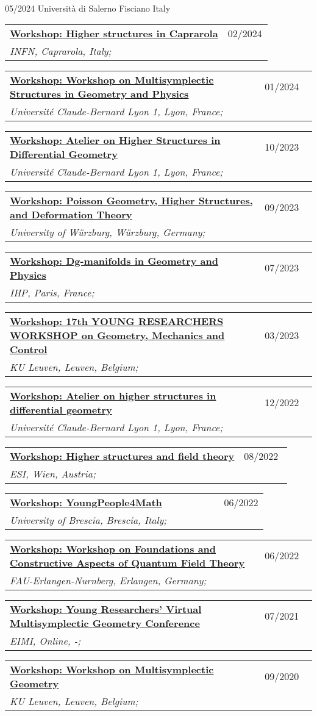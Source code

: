 \documentclass[a4paper]{article}
\newcommand{\longvoice}[8]{
	\begin{tabular}{p{0.83\linewidth} p{0.17\linewidth} }
		\textbf{\href{#3}{#2: #1}} & #4 
		\\ 
		\textit{#5, #6, #7;} & {\small\emph{#8}}
	\end{tabular}
	\vspace{.5em}
}
\begin{document}
		{05/2024}
		{Università di Salerno}
		{Fisciano}
		{Italy}
		{}
	\longvoice{Higher structures in Caprarola}
		{Workshop}
		{http://wpage.unina.it/francesco.dandrea/Caprarola2024/index.html}
		{02/2024}
		{INFN}
		{Caprarola}
		{Italy}
		{}
	\longvoice{Workshop on Multisymplectic Structures in Geometry and Physics}
		{Workshop}
		{https://math.gmu.edu/~cblacke/lyon.html}
		{01/2024}
		{Université Claude-Bernard Lyon 1}
		{Lyon}
		{France}
		{}
	\longvoice{Atelier on Higher Structures in Differential Geometry}
		{Workshop}
		{https://ryvkin.eu/hs2023/index.html}
		{10/2023}
		{Université Claude-Bernard Lyon 1}
		{Lyon}
		{France}
		{}
	\longvoice{Poisson Geometry, Higher Structures, and Deformation Theory}
		{Workshop}
		{https://www.mathematik.uni-wuerzburg.de/mathematicalphysics/forschung/veranstaltungen/workshops-und-konferenzen/single/news/poisson-geometry-higher-structures-and-deformation-theory/}
		{09/2023}
		{University of Würzburg}
		{Würzburg}
		{Germany}
		{}
	\longvoice{Dg-manifolds in Geometry and Physics}
		{Workshop}
		{https://indico.math.cnrs.fr/event/7885/}
		{07/2023}
		{IHP}
		{Paris}
		{France}
		{}
	\longvoice{17th YOUNG RESEARCHERS WORKSHOP on Geometry, Mechanics and Control}
		{Workshop}
		{https://wis.kuleuven.be/events/young-researchers-workshop2023/young-researchers-workshop2023}
		{03/2023}
		{KU Leuven}
		{Leuven}
		{Belgium}
		{}
	\longvoice{Atelier on higher structures in differential geometry}
		{Workshop}
		{https://ryvkin.eu/atelier2022/}
		{12/2022}
		{Université Claude-Bernard Lyon 1}
		{Lyon}
		{France}
		{}
	\longvoice{Higher structures and field theory}
		{Workshop}
		{https://www.esi.ac.at/events/e430/}
		{08/2022}
		{ESI}
		{Wien}
		{Austria}
		{}
	\longvoice{YoungPeople4Math}
		{Workshop}
		{https://www.dropbox.com/s/2elzcczx7m0o9zf/2206-Brescia-YoungPeople4Math.pdf?dl=0}
		{06/2022}
		{University of Brescia}
		{Brescia}
		{Italy}
		{}
	\longvoice{Workshop on Foundations and Constructive Aspects of Quantum Field Theory}
		{Workshop}
		{https://en.www.math.fau.de/mathematical-physics/gandalf-lechner/events10056/workshop-lqp46/}
		{06/2022}
		{FAU-Erlangen-Nurnberg}
		{Erlangen}
		{Germany}
		{}
	\longvoice{Young Researchers' Virtual Multisymplectic Geometry Conference}
		{Workshop}
		{https://public.eimi.ru/~cblacker/yrvmgc_21.html}
		{07/2021}
		{EIMI}
		{Online}
		{-}
		{}
	\longvoice{Workshop on Multisymplectic Geometry}
		{Workshop}
		{https://wis.kuleuven.be/events/archive/multisymplectic}
		{09/2020}
		{KU Leuven}
		{Leuven}
		{Belgium}
		{}
\end{document}
